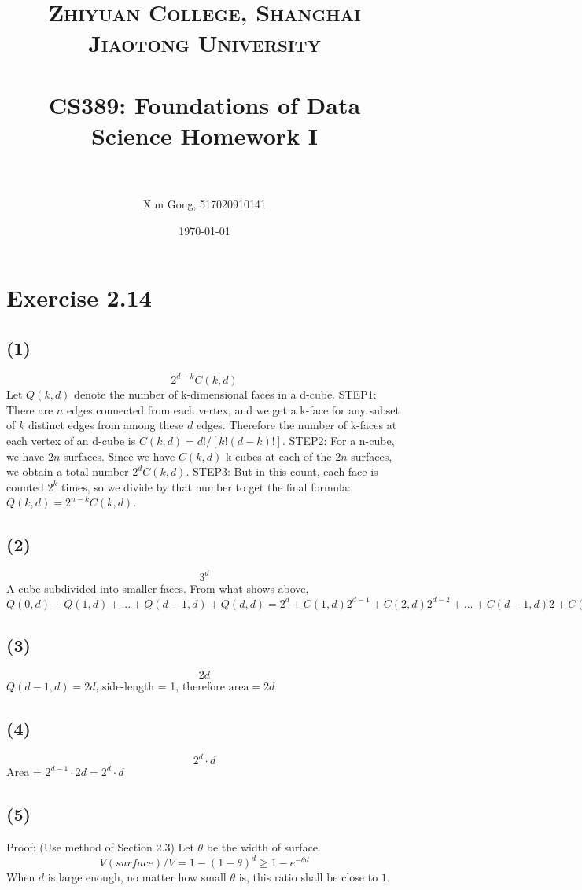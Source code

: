 \documentclass[paper=a4, fontsize=11pt]{scrartcl} %
\title{	
\normalfont \normalsize 
\textsc{Zhiyuan College, Shanghai Jiaotong University} \\ %
\horrule{0.5pt} \\[0.4cm] %
\huge CS389: Foundations of Data Science Homework I\\ %
\horrule{2pt} \\ %
}
\author{Xun Gong, 517020910141} %
\date{\normalsize\today} %
\numberwithin{equation}{section} %
\numberwithin{figure}{section} %
\numberwithin{table}{section} %
\begin{document}
\maketitle %

\section*{Exercise 2.14}
\subsection*{(1)}
$$ 2^{d-k}C(k, d) $$
Let $Q(k, d)$ denote the number of k-dimensional faces in a d-cube.
STEP1: There are $n$ edges connected from each vertex, and we get a k-face for any subset of $k$ distinct edges from among these $d$ edges. Therefore the number of k-faces at each vertex of an d-cube is $C(k, d) = d!/[k!(d - k)!]$.
STEP2: For a n-cube, we have $2n$ surfaces. Since we have $C(k, d)$ k-cubes at each of the $2n$ surfaces, we obtain a total number $2^dC(k, d)$. 
STEP3: But in this count, each face is counted $2^k$ times, so we divide by that number to get the final formula: $Q(k, d) = 2^{n-k}C(k, d)$.

\subsection*{(2)}
$$3^d$$
A cube subdivided into smaller faces. From what shows above, 
$Q(0,d) + Q(1,d) + ... + Q(d-1,d) + Q(d,d) 
= 2^d + C(1,d)2^{d-1} + C(2,d)2^{d-2} + ... + C(d-1,d)2 + C(d,d)
= (2 + 1)^d = 3^d$

\subsection*{(3)}
$$2d$$
$Q(d-1, d) = 2d$, side-length = 1, therefore $\text{area} = 2d$


\subsection*{(4)}
$$ 2^d\cdot d $$
Area = $ 2^{d-1} \cdot 2d = 2^d\cdot d$
\subsection*{(5)}
Proof: (Use method of Section 2.3)
Let $\theta$ be the width of surface.
$$V(\textit{surface}) / V = 1 - (1-\theta)^d \geq 1 - e^{-\theta d}$$
When $d$ is large enough, no matter how small $\theta$ is, this ratio shall be close to $1$.
\end{document}
